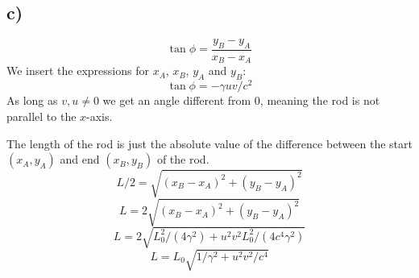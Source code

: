 \documentclass{article}
\begin{document}
\subsection*{c)}
\[
\tan ϕ = \frac{y_{B} - y_{A}}{x_{B} - x_{A}}
\]
We insert the expressions for $x_{A}$, $x_{B}$, $y_{A}$ and $y_{B}$:
\[
\tan ϕ = -γuv / c^2
\]
As long as $v,u ≠ 0$ we get an angle different from $0$, meaning the rod is not parallel to the $x$-axis.

The length of the rod is just the absolute value of the difference between the start $(x_{A}, y_{A})$ and end $(x_{B}, y_{B})$ of the rod. 
\[
L / 2 = \sqrt{(x_{B} - x_{A})^2 + (y_{B} - y_{A})^2}
\]
\[
L = 2\sqrt{(x_{B} - x_{A})^2 + (y_{B} - y_{A})^2}
\]
\[
L = 2\sqrt{L_0^2 / (4γ^2) + u^2v^2L_0^2 / (4c^4γ^2)}
\]
\[
L = L_0 \sqrt{1 / γ^2 + u^2v^2 / c^4}
\]
\end{document}
